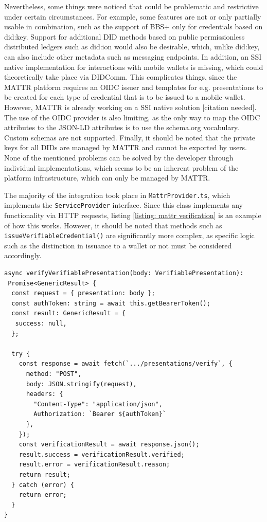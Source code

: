     Nevertheless, some things were noticed that could be problematic and restrictive under certain circumstances. For example, some features are not or only partially usable in combination, such as the support of BBS+ only for credentials based on did:key. Support for additional DID methods based on public permissionless distributed ledgers such as did:ion would also be desirable, which, unlike did:key, can also include other metadata such as messaging endpoints. In addition, an SSI native implementation for interactions with mobile wallets is missing, which could theoretically take place via DIDComm. This complicates things, since the MATTR platform requires an OIDC issuer and templates for e.g. presentations to be created for each type of credential that is to be issued to a mobile wallet. However, MATTR is already working on a \ac{SSI} native solution [citation needed]. The use of the OIDC provider is also limiting, as the only way to map the OIDC attributes to the JSON-LD attributes is to use the schema.org vocabulary. Custom schemas are not supported. Finally, it should be noted that the private keys for all \acp{DID} are managed by MATTR and cannot be exported by users. None of the mentioned problems can be solved by the developer through individual implementations, which seems to be an inherent problem of the platform infrastructure, which can only be managed by MATTR.
    
    The majority of the integration took place in \texttt{MattrProvider.ts}, which implements the \texttt{ServiceProvider} interface. Since this class implements any functionality via HTTP requests, listing \ref{listing: mattr verification} is an example of how this works. However, it should be noted that methods such as \texttt{issueVerifiableCredential()} are significantly more complex, as specific logic such as the distinction in issuance to a wallet or not must be considered accordingly.
    \newline
    
\begin{lstlisting}[style=ES6, caption=Example of mattr verification implementation, label={listing: mattr verification}]
async verifyVerifiablePresentation(body: VerifiablePresentation): 
 Promise<GenericResult> {
  const request = { presentation: body };
  const authToken: string = await this.getBearerToken();
  const result: GenericResult = {
   success: null,
  };

  try {
    const response = await fetch(`.../presentations/verify`, {
      method: "POST",
      body: JSON.stringify(request),
      headers: { 
        "Content-Type": "application/json", 
        Authorization: `Bearer ${authToken}` 
      },
    });
    const verificationResult = await response.json();
    result.success = verificationResult.verified;
    result.error = verificationResult.reason;
    return result;
  } catch (error) {
    return error;
  }
}\end{lstlisting}
    
